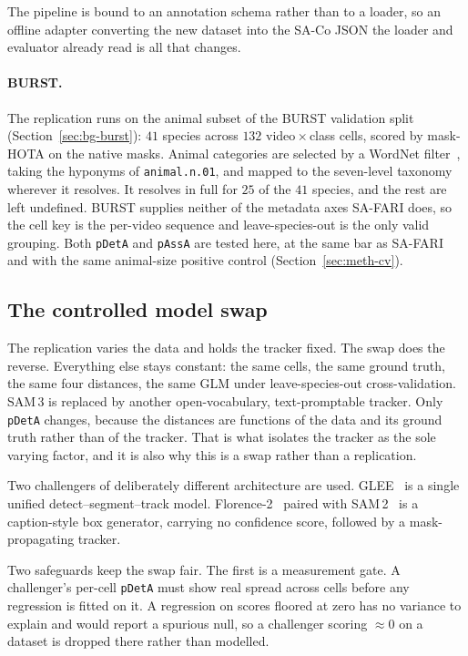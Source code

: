 The pipeline is bound to an annotation schema rather than to a loader, so an offline adapter converting the
new dataset into the SA-Co JSON the loader and evaluator already read is all that changes.

\paragraph{BURST.} The replication runs on the animal subset of the BURST validation split
(Section~\ref{sec:bg-burst}): $41$ species across $132$ video\,$\times$\,class cells, scored by mask-HOTA on
the native masks. Animal categories are selected by a WordNet filter~\cite{wordnet}, taking the hyponyms of
\texttt{animal.n.01}, and mapped to the seven-level taxonomy wherever it resolves. It resolves in full for $25$
of the $41$ species, and the rest are left undefined. BURST supplies neither of the metadata axes SA-FARI does,
so the cell key is the per-video sequence and leave-species-out is the only valid grouping. Both
\texttt{pDetA} and \texttt{pAssA} are tested here, at the same bar as SA-FARI and with the same animal-size
positive control (Section~\ref{sec:meth-cv}).

\subsection{The controlled model swap}
\label{sec:meth-swap}
The replication varies the data and holds the tracker fixed. The swap does the reverse. Everything else stays
constant: the same cells, the same ground truth, the same four distances, the same GLM under
leave-species-out cross-validation. SAM\,3 is replaced by another open-vocabulary, text-promptable tracker. Only \texttt{pDetA} changes, because the distances are functions of the data and its ground truth
rather than of the tracker. That is what isolates the tracker as the sole varying factor, and it is also why
this is a swap rather than a replication.

Two challengers of deliberately different architecture are used. GLEE~\cite{glee} is a single unified
detect--segment--track model. Florence-2~\cite{florence2} paired with SAM\,2~\cite{sam2} is a caption-style box
generator, carrying no confidence score, followed by a mask-propagating tracker.

Two safeguards keep the swap fair. The first is a measurement gate. A challenger's per-cell \texttt{pDetA} must
show real spread across cells before any regression is fitted on it. A regression on scores floored at zero has
no variance to explain and would report a spurious null, so a challenger scoring $\approx 0$ on a dataset is
dropped there rather than modelled.

